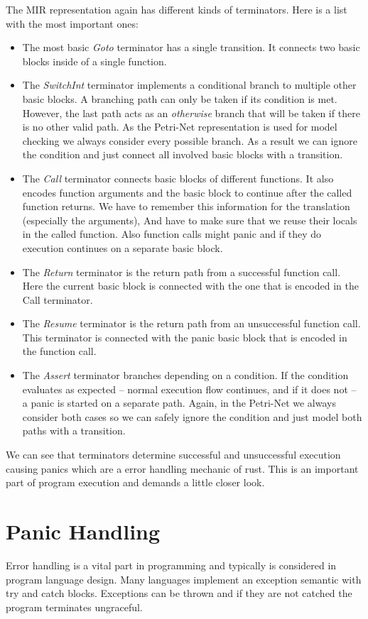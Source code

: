 The MIR representation again has different kinds of terminators. Here is a list with the most important ones:
\begin{itemize}
    \item The most basic \textit{Goto} terminator has a single transition.
    It connects two basic blocks inside of a single function.
    \item The \textit{SwitchInt} terminator implements a conditional branch to multiple other basic blocks.
    A branching path can only be taken if its condition is met.
    However, the last path acts as an \textit{otherwise} branch that will be taken if there is no other valid path.
    As the Petri-Net representation is used for model checking we always consider every possible branch.
    As a result we can ignore the condition and just connect all involved basic blocks with a transition.
    \item The \textit{Call} terminator connects basic blocks of different functions.
    It also encodes function arguments and the basic block to continue after the called function returns.
    We have to remember this information for the translation (especially the arguments),
    And have to make sure that we reuse their locals in the called function.
    Also function calls might panic and if they do execution continues on a separate basic block.
    \item The \textit{Return} terminator is the return path from a successful function call.
    Here the current basic block is connected with the one that is encoded in the Call terminator.
    \item The \textit{Resume} terminator is the return path from an unsuccessful function call.
    This terminator is connected with the panic basic block that is encoded in the function call.
    \item The \textit{Assert} terminator branches depending on a condition.
    If the condition evaluates as expected -- normal execution flow continues, and if it does not -- a panic is started on a separate path.
    Again, in the Petri-Net we always consider both cases so we can safely ignore the condition and just model both paths with a transition.
\end{itemize}
We can see that terminators determine successful and unsuccessful execution causing panics which are a error handling mechanic of rust.
This is an important part of program execution and demands a little closer look.

\section{Panic Handling}
Error handling is a vital part in programming and typically is considered in program language design.
Many languages implement an exception semantic with try and catch blocks.
Exceptions can be thrown and if they are not catched the program terminates ungraceful.

